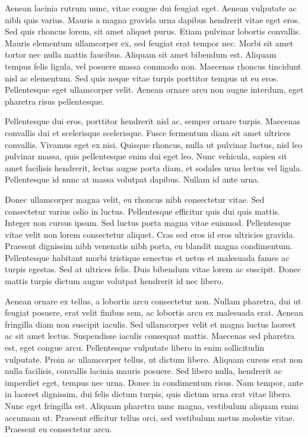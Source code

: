 Aenean lacinia rutrum nunc, vitae congue dui feugiat eget.
Aenean vulputate ac nibh quis varius.
Mauris a magna gravida urna dapibus hendrerit vitae eget eros.
Sed quis rhoncus lorem, sit amet aliquet purus.
Etiam pulvinar lobortis convallis.
Mauris elementum ullamcorper ex, sed feugiat erat tempor nec.
Morbi sit amet tortor nec nulla mattis faucibus.
Aliquam sit amet bibendum est.
Aliquam tempus felis ligula, vel posuere massa commodo non.
Maecenas rhoncus tincidunt nisl ac elementum.
Sed quis neque vitae turpis porttitor tempus ut eu eros.
Pellentesque eget ullamcorper velit.
Aenean ornare arcu non augue interdum, eget pharetra risus pellentesque.

Pellentesque dui eros, porttitor hendrerit nisl ac, semper ornare turpis.
Maecenas convallis dui et scelerisque scelerisque.
Fusce fermentum diam sit amet ultrices convallis.
Vivamus eget ex nisi.
Quisque rhoncus, nulla ut pulvinar luctus, nisl leo pulvinar massa, quis pellentesque enim dui eget leo.
Nunc vehicula, sapien sit amet facilisis hendrerit, lectus augue porta diam, et sodales urna lectus vel ligula.
Pellentesque id nunc at massa volutpat dapibus.
Nullam id ante urna.

Donec ullamcorper magna velit, eu rhoncus nibh consectetur vitae.
Sed consectetur varius odio in luctus.
Pellentesque efficitur quis dui quis mattis.
Integer non cursus ipsum.
Sed luctus porta magna vitae euismod.
Pellentesque vitae velit non lorem consectetur aliquet.
Cras sed eros id eros ultricies gravida.
Praesent dignissim nibh venenatis nibh porta, eu blandit magna condimentum.
Pellentesque habitant morbi tristique senectus et netus et malesuada fames ac turpis egestas.
Sed at ultrices felis.
Duis bibendum vitae lorem ac suscipit.
Donec mattis turpis dictum augue volutpat hendrerit id nec libero.

Aenean ornare ex tellus, a lobortis arcu consectetur non.
Nullam pharetra, dui ut feugiat posuere, erat velit finibus sem, ac lobortis arcu ex malesuada erat.
Aenean fringilla diam non suscipit iaculis.
Sed ullamcorper velit et magna luctus laoreet ac sit amet lectus.
Suspendisse iaculis consequat mattis.
Maecenas sed pharetra est, eget congue arcu.
Pellentesque vulputate libero in enim sollicitudin vulputate.
Proin ac ullamcorper tellus, ut dictum libero.
Aliquam cursus erat non nulla facilisis, convallis lacinia mauris posuere.
Sed libero nulla, hendrerit ac imperdiet eget, tempus nec urna.
Donec in condimentum risus.
Nam tempor, ante in laoreet dignissim, dui felis dictum turpis, quis dictum urna erat vitae libero.
Nunc eget fringilla est.
Aliquam pharetra nunc magna, vestibulum aliquam enim accumsan ut.
Praesent efficitur tellus orci, sed vestibulum metus molestie vitae.
Praesent eu consectetur arcu.


